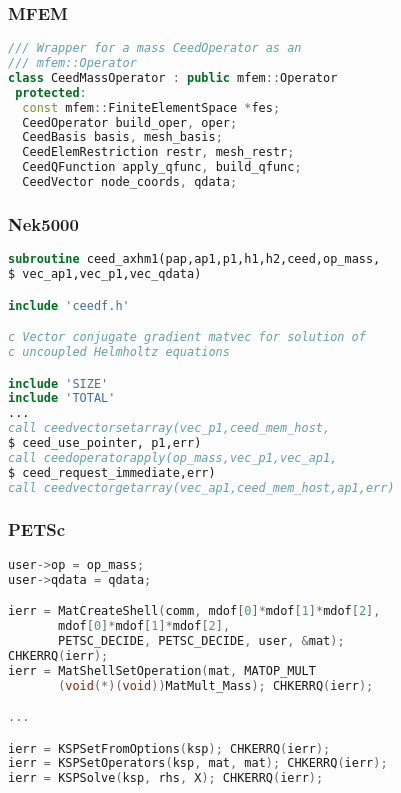 \documentclass{beamer}
\begin{document}

\begin{frame}[fragile]
\begin{center}
\frametitle{MFEM}

{\small
\begin{lstlisting}[language=c++]
/// Wrapper for a mass CeedOperator as an
/// mfem::Operator
class CeedMassOperator : public mfem::Operator
 protected:
  const mfem::FiniteElementSpace *fes;
  CeedOperator build_oper, oper;
  CeedBasis basis, mesh_basis;
  CeedElemRestriction restr, mesh_restr;
  CeedQFunction apply_qfunc, build_qfunc;
  CeedVector node_coords, qdata;

\end{lstlisting}
}

\end{center}
\end{frame}


\begin{frame}[fragile]
\begin{center}
\frametitle{Nek5000}

{\small
\begin{lstlisting}[language=Fortran]
subroutine ceed_axhm1(pap,ap1,p1,h1,h2,ceed,op_mass,
$ vec_ap1,vec_p1,vec_qdata)

include 'ceedf.h'

c Vector conjugate gradient matvec for solution of 
c uncoupled Helmholtz equations

include 'SIZE'
include 'TOTAL'
...
call ceedvectorsetarray(vec_p1,ceed_mem_host,
$ ceed_use_pointer, p1,err)
call ceedoperatorapply(op_mass,vec_p1,vec_ap1,
$ ceed_request_immediate,err)
call ceedvectorgetarray(vec_ap1,ceed_mem_host,ap1,err)
\end{lstlisting}
}

\end{center}
\end{frame}


\begin{frame}[fragile]
\begin{center}
\frametitle{PETSc}

{\small
\begin{lstlisting}[language=C]
user->op = op_mass;
user->qdata = qdata;

ierr = MatCreateShell(comm, mdof[0]*mdof[1]*mdof[2],
       mdof[0]*mdof[1]*mdof[2],
       PETSC_DECIDE, PETSC_DECIDE, user, &mat);
CHKERRQ(ierr);
ierr = MatShellSetOperation(mat, MATOP_MULT
       (void(*)(void))MatMult_Mass); CHKERRQ(ierr);

...

ierr = KSPSetFromOptions(ksp); CHKERRQ(ierr);
ierr = KSPSetOperators(ksp, mat, mat); CHKERRQ(ierr);
ierr = KSPSolve(ksp, rhs, X); CHKERRQ(ierr);
\end{lstlisting}
}

\end{center}
\end{frame}
\end{document}
